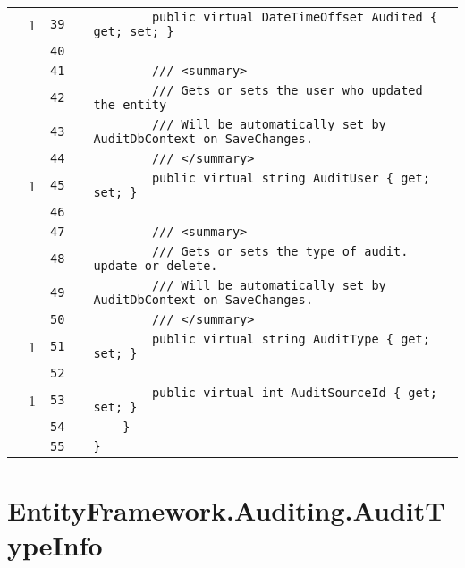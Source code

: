 \documentclass[a4paper,10pt]{article}
\begin{document}
\begin{longtable}[l]{lrrll}
\cellcolor{green} & 1 & \verb~39~ & & \verb~        public virtual DateTimeOffset Audited { get; set; }~\\
\cellcolor{gray} &  & \verb~40~ & & \verb~~\\
\cellcolor{gray} &  & \verb~41~ & & \verb~        /// <summary>~\\
\cellcolor{gray} &  & \verb~42~ & & \verb~        /// Gets or sets the user who updated the entity~\\
\cellcolor{gray} &  & \verb~43~ & & \verb~        /// Will be automatically set by AuditDbContext on SaveChanges.~\\
\cellcolor{gray} &  & \verb~44~ & & \verb~        /// </summary>~\\
\cellcolor{green} & 1 & \verb~45~ & & \verb~        public virtual string AuditUser { get; set; }~\\
\cellcolor{gray} &  & \verb~46~ & & \verb~~\\
\cellcolor{gray} &  & \verb~47~ & & \verb~        /// <summary>~\\
\cellcolor{gray} &  & \verb~48~ & & \verb~        /// Gets or sets the type of audit. update or delete.~\\
\cellcolor{gray} &  & \verb~49~ & & \verb~        /// Will be automatically set by AuditDbContext on SaveChanges.~\\
\cellcolor{gray} &  & \verb~50~ & & \verb~        /// </summary>~\\
\cellcolor{green} & 1 & \verb~51~ & & \verb~        public virtual string AuditType { get; set; }~\\
\cellcolor{gray} &  & \verb~52~ & & \verb~~\\
\cellcolor{green} & 1 & \verb~53~ & & \verb~        public virtual int AuditSourceId { get; set; }~\\
\cellcolor{gray} &  & \verb~54~ & & \verb~    }~\\
\cellcolor{gray} &  & \verb~55~ & & \verb~}~\\
\end{longtable}
\newpage
\section{EntityFramework.Auditing.AuditTypeInfo}
\end{document}
